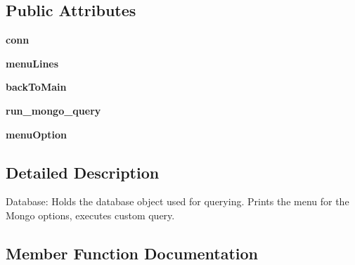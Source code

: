 \subsection*{Public Attributes}
\begin{DoxyCompactItemize}
\item 
\hypertarget{class_mongo_database_1_1_mongo_database_ac6b838c7e0c2357101e8e8db0dc94aa4}{}\label{class_mongo_database_1_1_mongo_database_ac6b838c7e0c2357101e8e8db0dc94aa4} 
{\bfseries conn}
\item 
\hypertarget{class_mongo_database_1_1_mongo_database_a6de8929dee773729992475177f062af8}{}\label{class_mongo_database_1_1_mongo_database_a6de8929dee773729992475177f062af8} 
{\bfseries menu\+Lines}
\item 
\hypertarget{class_mongo_database_1_1_mongo_database_ab4aeb0410a6d8f6fcdebb4f40ec68c48}{}\label{class_mongo_database_1_1_mongo_database_ab4aeb0410a6d8f6fcdebb4f40ec68c48} 
{\bfseries back\+To\+Main}
\item 
\hypertarget{class_mongo_database_1_1_mongo_database_ad8b5437c836f2ea68938f98431ae2028}{}\label{class_mongo_database_1_1_mongo_database_ad8b5437c836f2ea68938f98431ae2028} 
{\bfseries run\+\_\+mongo\+\_\+query}
\item 
\hypertarget{class_mongo_database_1_1_mongo_database_a2fb2dbb70d9b350dc0183c4f5da9f396}{}\label{class_mongo_database_1_1_mongo_database_a2fb2dbb70d9b350dc0183c4f5da9f396} 
{\bfseries menu\+Option}
\end{DoxyCompactItemize}


\subsection{Detailed Description}
\begin{DoxyVerb}Database: Holds the database object used for querying. Prints the menu
    for the Mongo options, executes custom query. \end{DoxyVerb}
 

\subsection{Member Function Documentation}
\hypertarget{class_mongo_database_1_1_mongo_database_af1be85a82838d6e46f181af707892606}{}\label{class_mongo_database_1_1_mongo_database_af1be85a82838d6e46f181af707892606} 
